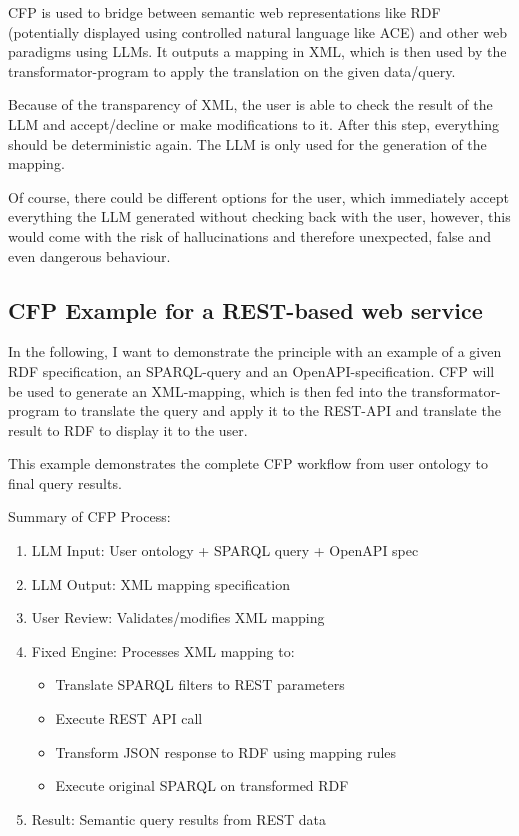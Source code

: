 \documentclass[12pt,a4paper]{article}
\begin{document}
CFP is used to bridge between semantic web representations like RDF (potentially displayed using controlled natural language like ACE) and other web paradigms using LLMs. It outputs a mapping in XML, which is then used by the transformator-program to apply the translation on the given data/query.

Because of the transparency of XML, the user is able to check the result of the LLM and accept/decline or make modifications to it. After this step, everything should be deterministic again. The LLM is only used for the generation of the mapping.

Of course, there could be different options for the user, which immediately accept everything the LLM generated without checking back with the user, however, this would come with the risk of hallucinations and therefore unexpected, false and even dangerous behaviour.

\subsection{CFP Example for a REST-based web service}

In the following, I want to demonstrate the principle with an example of a given RDF specification, an SPARQL-query and an OpenAPI-specification. CFP will be used to generate an XML-mapping, which is then fed into the transformator-program to translate the query and apply it to the REST-API and translate the result to RDF to display it to the user.

This example demonstrates the complete CFP workflow from user ontology to final query results.

Summary of CFP Process:
\begin{enumerate}
    \item LLM Input: User ontology + SPARQL query + OpenAPI spec
    \item LLM Output: XML mapping specification
    \item User Review: Validates/modifies XML mapping
    \item Fixed Engine: Processes XML mapping to:
    \begin{itemize}
        \item Translate SPARQL filters to REST parameters
        \item Execute REST API call
        \item Transform JSON response to RDF using mapping rules
        \item Execute original SPARQL on transformed RDF
    \end{itemize}
    \item Result: Semantic query results from REST data
\end{enumerate}
\end{document}
